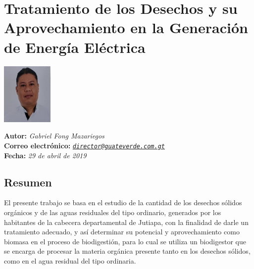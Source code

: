 \documentclass[11pt,spanish,Letterpaper,openany]{book}
\begin{document}
\hypertarget{gfong}{%
\chapter{Tratamiento de los Desechos y su Aprovechamiento en la Generación de Energía Eléctrica}\label{gfong}}

\begin {flushleft}

\begin{tcolorbox}[sharp corners=uphill, colback=fondo, colframe=fondo, arc=6mm, boxrule=0mm, boxsep=2mm,  opacityframe=0.19,  opacityback=0.19]

\begin{minipage}[c]{3cm}

\includegraphics[width=2.5cm,height=\textheight]{images/201901-gfong-photo.jpg}

\end{minipage}\begin{minipage}[c]{12cm}

\textbf{Autor:} \emph{Gabriel Fong Mazariegos}\\
\textbf{Correo electrónico:} \emph{\href{mailto:director@guateverde.com.gt}{\nolinkurl{director@guateverde.com.gt}}}\\
\textbf{Fecha:} \emph{29 de abril de 2019}

\end{minipage}

\end {tcolorbox}

\end {flushleft}

\hypertarget{resumen-1}{%
\section*{Resumen}\label{resumen-1}}

El presente trabajo se basa en el estudio de la cantidad de los desechos sólidos orgánicos y de las aguas residuales del tipo ordinario, generados por los habitantes de la cabecera departamental de Jutiapa, con la finalidad de darle un tratamiento adecuado, y así determinar su potencial y aprovechamiento como biomasa en el proceso de biodigestión, para lo cual se utiliza un biodigestor que se encarga de procesar la materia orgánica presente tanto en los desechos sólidos, como en el agua residual del tipo ordinaria.
\end{document}

